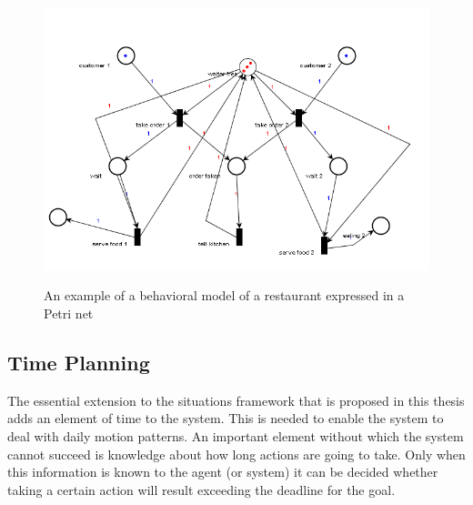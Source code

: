 \documentclass[11pt]{article}
\begin{document}
\begin{figure}
\begin{center}
\includegraphics[width=450pt]{restaurant.png}
\label{restaurantnet}
\end{center}
\caption{An example of a behavioral model of a restaurant expressed in a Petri net}

\end{figure}

\subsection{Time Planning}
The essential extension to the situations framework that is proposed in this thesis adds an element of time to the system. This is needed to enable the system to deal with daily motion patterns. An important element without which the system cannot succeed is knowledge about how long actions are going to take. Only when this information is known to the agent (or system) it can be decided whether taking a certain action will result exceeding the deadline for the goal.
\end{document}
